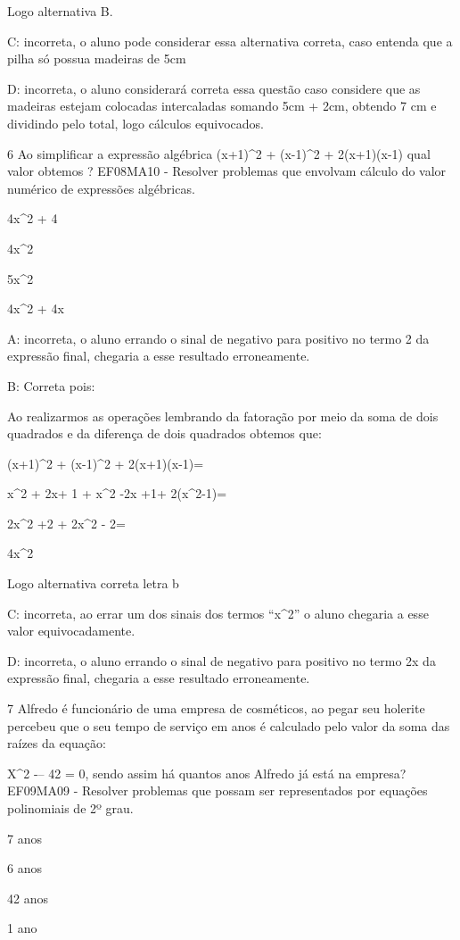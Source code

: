 Logo alternativa B.

C: incorreta, o aluno pode considerar essa alternativa correta, caso
entenda que a pilha só possua madeiras de 5cm

D: incorreta, o aluno considerará correta essa questão caso considere
que as madeiras estejam colocadas intercaladas somando 5cm + 2cm,
obtendo 7 cm e dividindo pelo total, logo cálculos equivocados.

\num{6} Ao simplificar a expressão algébrica (x+1)^2 + (x-1)^2 + 2(x+1)(x-1)
qual valor obtemos ? EF08MA10 - Resolver problemas que envolvam cálculo
do valor numérico de expressões algébricas.

\item 4x^2 + 4
\item 4x^2
\item 5x^2
\item 4x^2 + 4x

A: incorreta, o aluno errando o sinal de negativo para positivo no termo
2 da expressão final, chegaria a esse resultado erroneamente.

B: Correta pois:

Ao realizarmos as operações lembrando da fatoração por meio da soma de
dois quadrados e da diferença de dois quadrados obtemos que:

(x+1)^2 + (x-1)^2 + 2(x+1)(x-1)=

x^2 + 2x+ 1 + x^2 -2x +1+ 2(x^2-1)=

2x^2 +2 + 2x^2 - 2=

4x^2

Logo alternativa correta letra b

C: incorreta, ao errar um dos sinais dos termos ``x^2'' o aluno chegaria
a esse valor equivocadamente.

D: incorreta, o aluno errando o sinal de negativo para positivo no termo
2x da expressão final, chegaria a esse resultado erroneamente.

\num{7} Alfredo é funcionário de uma empresa de cosméticos, ao pegar seu
holerite percebeu que o seu tempo de serviço em anos é calculado pelo
valor da soma das raízes da equação:

X^2 -\times -- 42 = 0, sendo assim há quantos anos Alfredo já está na
empresa? EF09MA09 - Resolver problemas que possam ser representados por
equações polinomiais de 2º grau.

\item 7 anos
\item 6 anos
\item 42 anos
\item 1 ano


